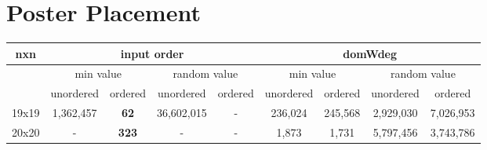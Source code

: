 \documentclass{article}
\begin{document}
    \section{ Poster Placement }
        \begin{tabular}{||c | c | c | c | c | c | c | c | c||} 
    \hline
      nxn & \multicolumn{4}{c|}{input order}  &  \multicolumn{4}{c||}{domWdeg} \\  \hline
          & \multicolumn{2}{c|}{min value}  & \multicolumn{2}{c|}{random value}  & \multicolumn{2}{c|}{min value}  &  \multicolumn{2}{c||}{random value} \\  \hline
          & unordered & ordered & unordered & ordered & unordered & ordered & unordered & ordered  \\  \hline
    19x19 & 1,362,457 & \textbf{62} & 36,602,015 & - & 236,024 & 245,568 & 2,929,030 & 7,026,953 \\  \hline
    20x20 & - & \textbf{323} & - & - & 1,873 & 1,731 & 5,797,456 & 3,743,786 \\  \hline
    \end{tabular}
\end{document}
